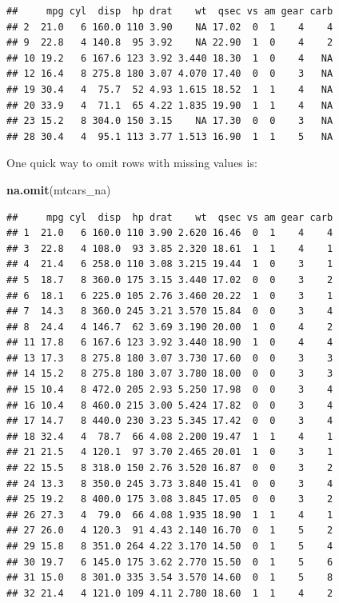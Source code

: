 \documentclass[]{book}
\newenvironment{Shaded}{\begin{snugshade}}{\end{snugshade}}
\newcommand{\KeywordTok}[1]{\textcolor[rgb]{0.13,0.29,0.53}{\textbf{#1}}}
\newcommand{\NormalTok}[1]{#1}
\begin{document}
\begin{verbatim}
##     mpg cyl  disp  hp drat    wt  qsec vs am gear carb
## 2  21.0   6 160.0 110 3.90    NA 17.02  0  1    4    4
## 9  22.8   4 140.8  95 3.92    NA 22.90  1  0    4    2
## 10 19.2   6 167.6 123 3.92 3.440 18.30  1  0    4   NA
## 12 16.4   8 275.8 180 3.07 4.070 17.40  0  0    3   NA
## 19 30.4   4  75.7  52 4.93 1.615 18.52  1  1    4   NA
## 20 33.9   4  71.1  65 4.22 1.835 19.90  1  1    4   NA
## 23 15.2   8 304.0 150 3.15    NA 17.30  0  0    3   NA
## 28 30.4   4  95.1 113 3.77 1.513 16.90  1  1    5   NA
\end{verbatim}

One quick way to omit rows with missing values is:

\begin{Shaded}
\begin{Highlighting}[]
\KeywordTok{na.omit}\NormalTok{(mtcars_na)}
\end{Highlighting}
\end{Shaded}

\begin{verbatim}
##     mpg cyl  disp  hp drat    wt  qsec vs am gear carb
## 1  21.0   6 160.0 110 3.90 2.620 16.46  0  1    4    4
## 3  22.8   4 108.0  93 3.85 2.320 18.61  1  1    4    1
## 4  21.4   6 258.0 110 3.08 3.215 19.44  1  0    3    1
## 5  18.7   8 360.0 175 3.15 3.440 17.02  0  0    3    2
## 6  18.1   6 225.0 105 2.76 3.460 20.22  1  0    3    1
## 7  14.3   8 360.0 245 3.21 3.570 15.84  0  0    3    4
## 8  24.4   4 146.7  62 3.69 3.190 20.00  1  0    4    2
## 11 17.8   6 167.6 123 3.92 3.440 18.90  1  0    4    4
## 13 17.3   8 275.8 180 3.07 3.730 17.60  0  0    3    3
## 14 15.2   8 275.8 180 3.07 3.780 18.00  0  0    3    3
## 15 10.4   8 472.0 205 2.93 5.250 17.98  0  0    3    4
## 16 10.4   8 460.0 215 3.00 5.424 17.82  0  0    3    4
## 17 14.7   8 440.0 230 3.23 5.345 17.42  0  0    3    4
## 18 32.4   4  78.7  66 4.08 2.200 19.47  1  1    4    1
## 21 21.5   4 120.1  97 3.70 2.465 20.01  1  0    3    1
## 22 15.5   8 318.0 150 2.76 3.520 16.87  0  0    3    2
## 24 13.3   8 350.0 245 3.73 3.840 15.41  0  0    3    4
## 25 19.2   8 400.0 175 3.08 3.845 17.05  0  0    3    2
## 26 27.3   4  79.0  66 4.08 1.935 18.90  1  1    4    1
## 27 26.0   4 120.3  91 4.43 2.140 16.70  0  1    5    2
## 29 15.8   8 351.0 264 4.22 3.170 14.50  0  1    5    4
## 30 19.7   6 145.0 175 3.62 2.770 15.50  0  1    5    6
## 31 15.0   8 301.0 335 3.54 3.570 14.60  0  1    5    8
## 32 21.4   4 121.0 109 4.11 2.780 18.60  1  1    4    2
\end{verbatim}
\end{document}
